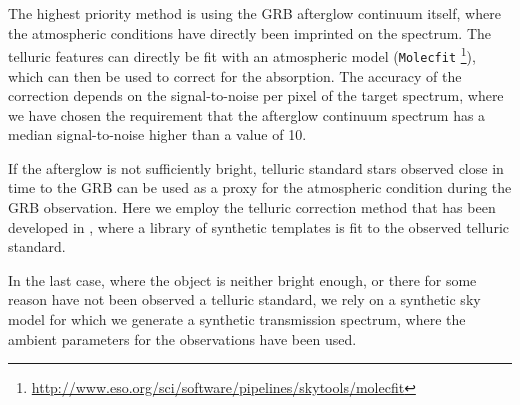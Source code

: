 \documentclass{aa}    %
\begin{document}
The highest priority method is using the GRB afterglow continuum itself, where
the atmospheric conditions have directly been imprinted on the spectrum. The
telluric features can directly be fit with an atmospheric model
(\texttt{Molecfit} \citep{Smette2015,
	Kausch2015}\footnote{\url{http://www.eso.org/sci/software/pipelines/skytools/molecfit}}), which can then be used to correct for the absorption. The accuracy of the correction depends on the signal-to-noise per pixel of the target spectrum, where we have chosen the requirement that the afterglow continuum spectrum has a median signal-to-noise higher than a value of 10.

If the afterglow is not sufficiently bright, telluric standard stars observed
close in time to the GRB can be used as a proxy for the atmospheric
condition during the GRB observation. Here we employ the telluric correction
method that has been developed in \citet{Selsing2015}, where a library of
synthetic templates is fit to the observed telluric standard.

In the last case, where the object is neither bright enough, or there for some
reason have not been observed a telluric standard, we rely on a synthetic sky
model \citep{Noll2012, Jones2013} for which we generate a
synthetic transmission spectrum, where the ambient parameters for the
observations have been used.
\end{document}
